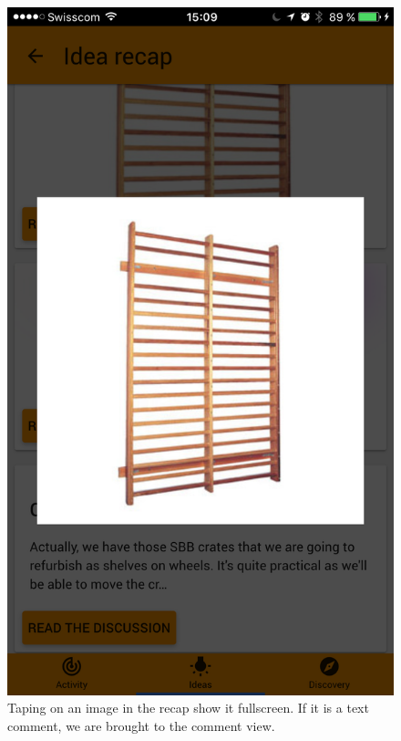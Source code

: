 \documentclass[a4paper,12pt,twoside]{article}
\begin{document}
\begin{figure}[!htb]
    \begin{minipage}[t]{.48\textwidth}
        \centering
        \includegraphics[width=.67\textwidth]{images/flow_recap_3.png}
        \caption{Taping on an image in the recap show it fullscreen. If it is a text comment, we are brought to the comment view.}
    \end{minipage}
    \hfill
    \begin{minipage}[t]{.48\textwidth}
        \centering

\end{minipage}
\end{figure}
\end{document}
